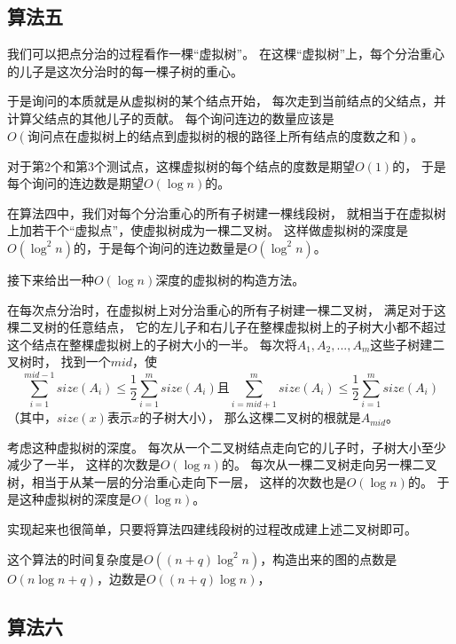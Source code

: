 \documentclass{noiassignment}
\begin{document}
\subsection{算法五}
我们可以把点分治的过程看作一棵``虚拟树''。
在这棵``虚拟树''上，每个分治重心的儿子是这次分治时的每一棵子树的重心。

于是询问的本质就是从虚拟树的某个结点开始，
每次走到当前结点的父结点，并计算父结点的其他儿子的贡献。
每个询问连边的数量应该是\mbox{$O(\texttt{询问点在虚拟树上的结点到虚拟树的根的路径上所有结点的度数之和})$}。

对于第2个和第3个测试点，这棵虚拟树的每个结点的度数是期望$O(1)$的，
于是每个询问的连边数是期望$O(\log n)$的。

在算法四中，我们对每个分治重心的所有子树建一棵线段树，
就相当于在虚拟树上加若干个``虚拟点''，使虚拟树成为一棵二叉树。
这样做虚拟树的深度是$O(\log ^ 2 n)$的，于是每个询问的连边数量是$O(\log ^ 2 n)$。

接下来给出一种$O(\log n)$深度的虚拟树的构造方法。

在每次点分治时，在虚拟树上对分治重心的所有子树建一棵二叉树，
满足对于这棵二叉树的任意结点，
它的左儿子和右儿子在整棵虚拟树上的子树大小都不超过这个结点在整棵虚拟树上的子树大小的一半。
每次将$A_1, A_2, ..., A_m$这些子树建二叉树时，
找到一个$mid$，使
\begin{equation}
\sum_{i=1}^{mid-1} size(A_i) \le \frac{1}{2} \sum_{i=1}^{m} size(A_i)
\text{且}
\sum_{i=mid+1}^{m} size(A_i) \le \frac{1}{2} \sum_{i=1}^{m} size(A_i)
\end{equation}
（其中，$size(x)$表示$x$的子树大小），
那么这棵二叉树的根就是$A_{mid}$。

考虑这种虚拟树的深度。
每次从一个二叉树结点走向它的儿子时，子树大小至少减少了一半，
这样的次数是$O(\log n)$的。
每次从一棵二叉树走向另一棵二叉树，相当于从某一层的分治重心走向下一层，
这样的次数也是$O(\log n)$的。
于是这种虚拟树的深度是$O(\log n)$。

实现起来也很简单，只要将算法四建线段树的过程改成建上述二叉树即可。

这个算法的时间复杂度是$O((n+q) \log ^ 2 n)$，构造出来的图的点数是$O(n \log n + q)$，边数是$O((n+q) \log n)$，









\subsection{算法六}
\end{document}
